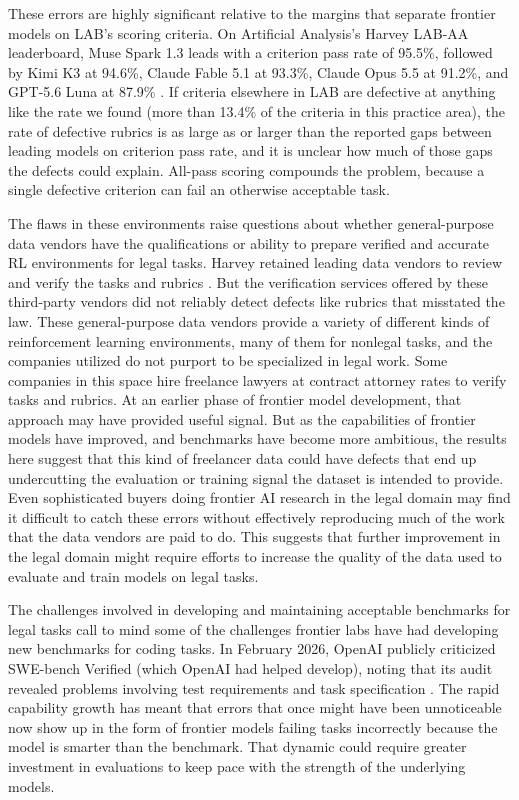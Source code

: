 \documentclass[11pt]{article}
\newcommand{\labDefectiveShare}{13.4}
\begin{document}
These errors are highly significant relative to the margins that separate frontier models on LAB's scoring criteria. On Artificial Analysis's Harvey LAB-AA leaderboard, Muse Spark 1.3 leads with a criterion pass rate of 95.5\%, followed by Kimi K3 at 94.6\%, Claude Fable 5.1 at 93.3\%, Claude Opus 5.5 at 91.2\%, and GPT-5.6 Luna at 87.9\% \citep{labAAboard}. If criteria elsewhere in LAB are defective at anything like the rate we found (more than \labDefectiveShare\% of the criteria in this practice area), the rate of defective rubrics is as large as or larger than the reported gaps between leading models on criterion pass rate, and it is unclear how much of those gaps the defects could explain. All-pass scoring compounds the problem, because a single defective criterion can fail an otherwise acceptable task.

The flaws in these environments raise questions about whether general-purpose data vendors have the qualifications or ability to prepare verified and accurate RL environments for legal tasks. Harvey retained leading data vendors to review and verify the tasks and rubrics \citep{harveyResearchLab}. But the verification services offered by these third-party vendors did not reliably detect defects like rubrics that misstated the law. These general-purpose data vendors provide a variety of different kinds of reinforcement learning environments, many of them for nonlegal tasks, and the companies utilized do not purport to be specialized in legal work. Some companies in this space hire freelance lawyers at contract attorney rates to verify tasks and rubrics. At an earlier phase of frontier model development, that approach may have provided useful signal. But as the capabilities of frontier models have improved, and benchmarks have become more ambitious, the results here suggest that this kind of freelancer data could have defects that end up undercutting the evaluation or training signal the dataset is intended to provide. Even sophisticated buyers doing frontier AI research in the legal domain may find it difficult to catch these errors without effectively reproducing much of the work that the data vendors are paid to do. This suggests that further improvement in the legal domain might require efforts to increase the quality of the data used to evaluate and train models on legal tasks.

The challenges involved in developing and maintaining acceptable benchmarks for legal tasks call to mind some of the challenges frontier labs have had developing new benchmarks for coding tasks. In February 2026, OpenAI publicly criticized SWE-bench Verified (which OpenAI had helped develop), noting that its audit revealed problems involving test requirements and task specification \citep{swecritique}. The rapid capability growth has meant that errors that once might have been unnoticeable now show up in the form of frontier models failing tasks incorrectly because the model is smarter than the benchmark. That dynamic could require greater investment in evaluations to keep pace with the strength of the underlying models.
\end{document}
